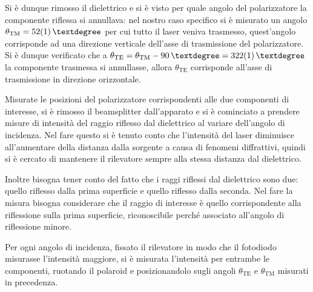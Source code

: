 \documentclass[10pt,oneside,a4paper]{article}
\begin{document}
\begin{multicols}{2}
Si è dunque rimosso il dielettrico e si è visto per quale angolo del polarizzatore la componente riflessa si annullava: nel nostro caso specifico si è misurato un angolo $\theta_{\mathrm{TM}} = \SI{52 \pm 1}{°}$ per cui tutto il laser veniva trasmesso, quest'angolo corrisponde ad una direzione verticale dell'asse di trasmissione del polarizzatore. Si è dunque verificato che a $\theta_{\mathrm{TE}} = \theta_{\mathrm{TM}} - \SI{90}{°} = \SI{322 \pm 1}{°}$ la componente trasmessa si annullasse, allora $\theta_{\mathrm{TE}}$ corrisponde all'asse di trasmissione in direzione orizzontale.

Misurate le posizioni del polarizzatore corrispondenti alle due componenti di interesse, si è rimosso il beamsplitter dall'apparato e si è cominciato a prendere misure di intensità del raggio riflesso dal dielettrico al variare dell'angolo di incidenza. Nel fare questo si è tenuto conto che l'intensità del laser diminuisce all'aumentare della distanza dalla sorgente a causa di fenomeni diffrattivi, quindi si è cercato di mantenere il rilevatore sempre alla stessa distanza dal dielettrico.

Inoltre bisogna tener conto del fatto che i raggi riflessi dal dielettrico sono due: quello riflesso dalla prima superficie e quello riflesso dalla seconda. Nel fare la misura bisogna considerare che il raggio di interesse è quello corrispondente alla riflessione sulla prima superficie, riconoscibile perché associato all'angolo di riflessione minore.

Per ogni angolo di incidenza, fissato il rilevatore in modo che il fotodiodo misurasse l'intensità maggiore, si è misurata l'intensità per entrambe le componenti, ruotando il polaroid e posizionandolo sugli angoli $\theta_{\mathrm{TE}}$ e $\theta_{\mathrm{TM}}$ misurati in precedenza.


\end{multicols}
\end{document}
